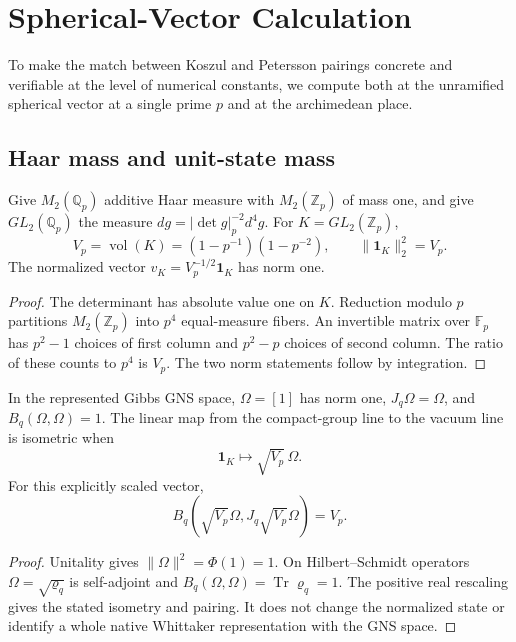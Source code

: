 \section{Spherical-Vector Calculation}
\label{v4-arith:kp:spherical-calc}

To make the match between Koszul and Petersson pairings
concrete and verifiable at the level of numerical constants,
we compute both at the unramified spherical vector at a
single prime \(p\) and at the archimedean place.

\subsection{Haar mass and unit-state mass}
\label{v4-arith:kp:spherical-calc:Pet-p}
\label{v4-arith:kp:spherical-calc:Koszul-p}

\begin{lemma}
\label{v4-arith:kp:lem:spherical-Pet-p}
Give \(M_2(\mathbb Q_p)\) additive Haar measure with
\(M_2(\mathbb Z_p)\) of mass one, and give \(GL_2(\mathbb Q_p)\) the
measure \(dg=|\det g|_p^{-2}d^4g\). For \(K=GL_2(\mathbb Z_p)\),
\begin{equation}
 V_p=\operatorname{vol}(K)=(1-p^{-1})(1-p^{-2}),
 \qquad \|\mathbf1_K\|_2^2=V_p.
 \label{v4-arith:kp:eq:spherical-Pet-p}
\end{equation}
The normalized vector \(v_K=V_p^{-1/2}\mathbf1_K\) has norm one.
\end{lemma}
\begin{proof}
The determinant has absolute value one on \(K\). Reduction modulo \(p\)
partitions \(M_2(\mathbb Z_p)\) into \(p^4\) equal-measure fibers.
An invertible matrix over \(\mathbb F_p\) has \(p^2-1\) choices of
first column and \(p^2-p\) choices of second column. The ratio of
these counts to \(p^4\) is \(V_p\). The two norm statements follow
by integration.
\end{proof}

\begin{lemma}
\label{v4-arith:kp:lem:spherical-Koszul-p}
In the represented Gibbs GNS space, \(\Omega=[1]\) has norm one,
\(J_q\Omega=\Omega\), and \(B_q(\Omega,\Omega)=1\). The linear map
from the compact-group line to the vacuum line is isometric when
\[
             \mathbf1_K\longmapsto\sqrt{V_p}\,\Omega.
\]
For this explicitly scaled vector,
\begin{equation}
 B_q(\sqrt{V_p}\Omega,J_q\sqrt{V_p}\Omega)=V_p.
 \label{v4-arith:kp:eq:spherical-Koszul-p}
\end{equation}
\end{lemma}
\begin{proof}
Unitality gives \(\|\Omega\|^2=\Phi(1)=1\). On Hilbert--Schmidt
operators \(\Omega=\sqrt{\varrho_q}\) is self-adjoint and
\(B_q(\Omega,\Omega)=\operatorname{Tr}\varrho_q=1\).
The positive real rescaling gives the stated isometry and pairing.
It does not change the normalized state or identify a whole native
Whittaker representation with the GNS space.
\end{proof}


